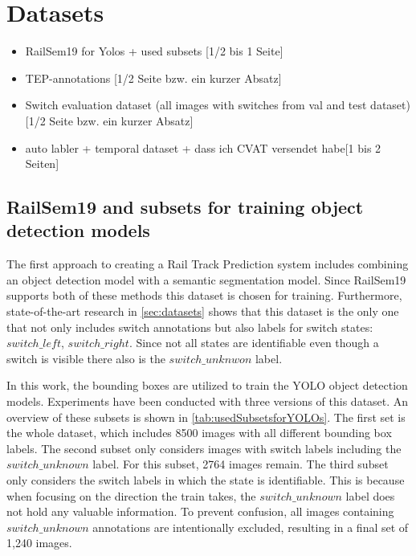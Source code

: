 \section{Datasets}

\begin{itemize}
    \item RailSem19 for Yolos + used subsets [1/2 bis 1 Seite]
    \item TEP-annotations [1/2 Seite bzw. ein kurzer Absatz]
    \item Switch evaluation dataset (all images with switches from val and test dataset) [1/2 Seite bzw. ein kurzer Absatz]
    \item auto labler + temporal dataset + dass ich CVAT versendet habe[1 bis 2 Seiten]
\end{itemize}

\subsection{RailSem19 and subsets for training object detection models}

The first approach to creating a Rail Track Prediction system includes combining an object detection model with a semantic segmentation model.
Since RailSem19 supports both of these methods this dataset is chosen for training.
Furthermore, state-of-the-art research in \autoref{sec:datasets} shows that this dataset is the only one that not only includes switch annotations but also labels for switch states: $switch\_left$, $switch\_right$.
Since not all states are identifiable even though a switch is visible there also is the $switch\_unknwon$ label.

In this work, the bounding boxes are utilized to train the \ac{YOLO} object detection models.
Experiments have been conducted with three versions of this dataset.
An overview of these subsets is shown in \autoref{tab:usedSubsetsforYOLOs}.
The first set is the whole dataset, which includes 8500 images with all different bounding box labels.
The second subset only considers images with switch labels including the $switch\_unknown$ label.
For this subset, 2764 images remain. The third subset only considers the switch labels in which the state is identifiable.
This is because when focusing on the direction the train takes, the $switch\_unknown$ label does not hold any valuable information.
To prevent confusion, all images containing $switch\_unknown$ annotations are intentionally excluded, resulting in a final set of 1,240 images.


